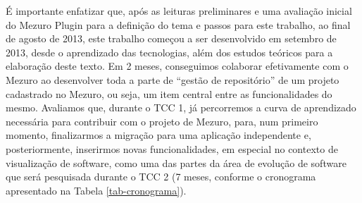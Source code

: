 É importante enfatizar que, após as leituras preliminares e uma avaliação inicial do Mezuro Plugin para a definição do tema e passos para este trabalho, ao final de agosto de 2013, este trabalho começou a ser desenvolvido em setembro de 2013, desde o aprendizado das tecnologias, além dos estudos teóricos para a elaboração deste texto.
%
Em 2 meses, conseguimos colaborar efetivamente com o Mezuro ao desenvolver toda a parte de ``gestão de repositório'' de um projeto cadastrado no Mezuro, ou seja, um item central entre as funcionalidades do mesmo.
%
Avaliamos que, durante o TCC 1, já percorremos a curva de aprendizado necessária para contribuir com o projeto de Mezuro, para, num primeiro momento, finalizarmos a migração para uma aplicação independente e, posteriormente, inserirmos novas funcionalidades, em especial no contexto de visualização de software, como uma das partes da área de evolução de software que será pesquisada durante o TCC 2 (7 meses, conforme o cronograma apresentado na Tabela \ref{tab-cronograma}).
 

